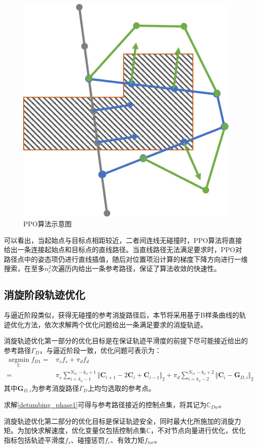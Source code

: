 \documentclass[lang=chs, degree=master, blindreview=false, winfonts=true]{yanputhesis}
\begin{document}
\begin{figure}[hbt!]
	\centering
	\includegraphics[width=2.5 in]{picture/PPO_pic.png}
	\caption{PPO算法示意图\label{Fig.PPO}}
\end{figure}

可以看出，当起始点与目标点相距较近，二者间连线无碰撞时，PPO算法将直接给出一条连接起始点和目标点的直线路径。当直线路径无法满足要求时，PPO对路径点中的姿态项仍进行直线插值，随后对位置项沿计算的梯度下降方向进行一维搜索，在至多$n_c^2$次遍历内给出一条参考路径，保证了算法收敛的快速性。

\subsection{消旋阶段轨迹优化}
与逼近阶段类似，获得无碰撞的参考消旋路径后，本节将采用基于B样条曲线的轨迹优化方法，依次求解两个优化问题给出一条满足要求的消旋轨迹。

消旋轨迹优化第一部分的优化目标是在保证轨迹平滑度的前提下尽可能接近给出的参考路径$\Gamma_{D}$，与逼近阶段一致，优化问题可表示为：
\begin{equation}
	\begin{aligned}
		\label{detumbing_phase1}
		\mathop{\arg\min}\limits_{\mathbb{C}} f_{D1}=&\pi_{s}f_{s}+\pi_{d}f_{d}\\
		=&\pi_{s}\sum_{i=k_{o}-1}^{N_{c1}-k_{o}+1}\Vert\boldsymbol{C}_{i+1}-2 \boldsymbol{C}_i+\boldsymbol{C}_{i-1}\Vert_2+\pi_{d}\sum_{i=k_{o}-2}^{N_{c1}-k_{o}+2}\Vert \boldsymbol{C}_i-\boldsymbol{G}_{D,i}\Vert_2
	\end{aligned}
\end{equation}
其中$\boldsymbol{G}_{D,i}$为参考消旋路径$\Gamma_{D}$上均匀选取的参考点。

求解\autoref{detumbing_phase1}可得与参考路径接近的控制点集，将其记为$\mathbb{C}_{Dw}$。

消旋轨迹优化第二部分的优化目标是保证轨迹安全，同时最大化所施加的消旋力矩。为加快求解速度，优化变量仅包括控制点集$\mathbb{C}$，不对节点向量进行优化，优化指标包括轨迹平滑度$f_{s}$、碰撞惩罚$f_{c}$、有效力矩$f_{tor}$。
\end{document}
